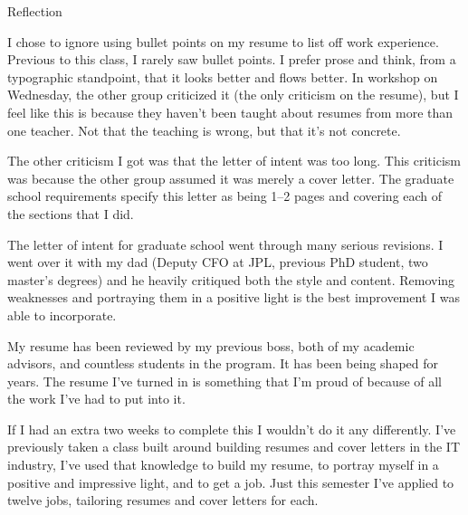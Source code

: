 \documentclass{article}
\begin{document}
\begin{center}
    {\Large Reflection}
\end{center}

I chose to ignore using bullet points on my resume to list off work experience. Previous to this class, I rarely saw bullet points. I prefer prose and think, from a typographic standpoint, that it looks better and flows better. In workshop on Wednesday, the other group criticized it (the only criticism on the resume), but I feel like this is because they haven't been taught about resumes from more than one teacher. Not that the teaching is wrong, but that it's not concrete.

The other criticism I got was that the letter of intent was too long. This criticism was because the other group assumed it was merely a cover letter. The graduate school requirements specify this letter as being 1--2 pages and covering each of the sections that I did.

The letter of intent for graduate school went through many serious revisions. I went over it with my dad (Deputy CFO at JPL, previous PhD student, two master's degrees) and he heavily critiqued both the style and content. Removing weaknesses and portraying them in a positive light is the best improvement I was able to incorporate.

My resume has been reviewed by my previous boss, both of my academic advisors, and countless students in the program. It has been being shaped for years. The resume I've turned in is something that I'm proud of because of all the work I've had to put into it.

If I had an extra two weeks to complete this I wouldn't do it any differently. I've previously taken a class built around building resumes and cover letters in the IT industry, I've used that knowledge to build my resume, to portray myself in a positive and impressive light, and to get a job. Just this semester I've applied to twelve jobs, tailoring resumes and cover letters for each.
\end{document}
